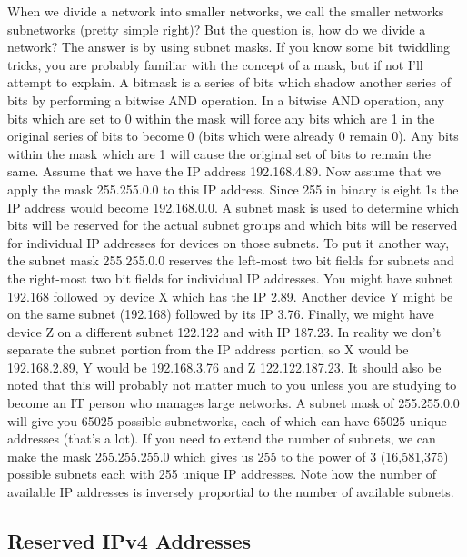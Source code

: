 \documentclass{article}
\begin{document}
When we divide a network into smaller networks, we call the smaller networks subnetworks (pretty simple right)?
But the question is, how do we divide a network? The answer is by using subnet masks. If you know some bit
twiddling tricks, you are probably familiar with the concept of a mask, but if not I'll attempt to explain. A
bitmask is a series of bits which shadow another series of bits by performing a bitwise AND operation. In a
bitwise AND operation, any bits which are set to 0 within the mask will force any bits which are 1 in the
original series of bits to become 0 (bits which were already 0 remain 0). Any bits within the mask which are 1
will cause the original set of bits to remain the same. Assume that we have the IP address 192.168.4.89. Now
assume that we apply the mask 255.255.0.0 to this IP address. Since 255 in binary is eight 1s the IP address
would become 192.168.0.0. A subnet mask is used to determine which bits will be reserved for the actual subnet
groups and which bits will be reserved for individual IP addresses for devices on those subnets. To put it
another way, the subnet mask 255.255.0.0 reserves the left-most two bit fields for subnets and the right-most
two bit fields for individual IP addresses. You might have subnet 192.168 followed by device X which has the
IP 2.89. Another device Y might be on the same subnet (192.168) followed by its IP 3.76. Finally, we might
have device Z on a different subnet 122.122 and with IP 187.23. In reality we don't separate the subnet portion
from the IP address portion, so X would be 192.168.2.89, Y would be 192.168.3.76 and Z 122.122.187.23. It
should also be noted that this will probably not matter much to you unless you are studying to become an IT
person who manages large networks. A subnet mask of 255.255.0.0 will give you 65025 possible subnetworks, each
of which can have 65025 unique addresses (that's a lot). If you need to extend the number of subnets, we can
make the mask 255.255.255.0 which gives us 255 to the power of 3 (16,581,375) possible subnets each with 255
unique IP addresses. Note how the number of available IP addresses is inversely proportial to the number of
available subnets.

\subsection{Reserved IPv4 Addresses}
\end{document}
